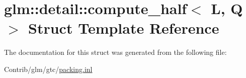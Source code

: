 \hypertarget{structglm_1_1detail_1_1compute__half}{}\section{glm\+:\+:detail\+:\+:compute\+\_\+half$<$ L, Q $>$ Struct Template Reference}
\label{structglm_1_1detail_1_1compute__half}


The documentation for this struct was generated from the following file\+:\begin{DoxyCompactItemize}
\item 
Contrib/glm/gtc/\mbox{\hyperlink{packing_8inl}{packing.\+inl}}\end{DoxyCompactItemize}
